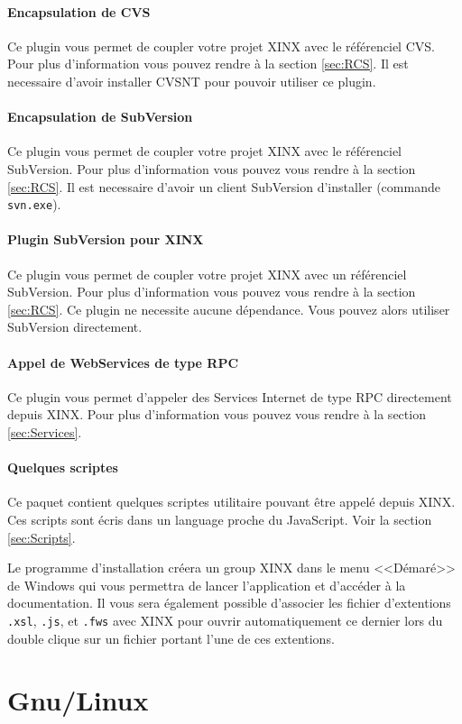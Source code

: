 \documentclass[a4paper,10pt,twoside]{book}
\begin{document}
\paragraph{Encapsulation de CVS} Ce plugin vous permet de coupler votre projet XINX avec le référenciel CVS. Pour plus d'information vous pouvez rendre à la section \ref{sec:RCS}. Il est necessaire d'avoir installer CVSNT pour pouvoir utiliser ce plugin.
\paragraph{Encapsulation de SubVersion} Ce plugin vous permet de coupler votre projet XINX avec le référenciel SubVersion. Pour plus d'information vous pouvez vous rendre à la section \ref{sec:RCS}. Il est necessaire d'avoir un client SubVersion d'installer (commande \verb+svn.exe+).
\paragraph{Plugin SubVersion pour XINX} Ce plugin vous permet de coupler votre projet XINX avec un référenciel SubVersion. Pour plus d'information vous pouvez vous rendre à la section \ref{sec:RCS}. Ce plugin ne necessite aucune dépendance. Vous pouvez alors utiliser SubVersion directement.
\paragraph{Appel de WebServices de type RPC} Ce plugin vous permet d'appeler des Services Internet de type RPC directement depuis XINX. Pour plus d'information vous pouvez vous rendre à la section \ref{sec:Services}.
\paragraph{Quelques scriptes} Ce paquet contient quelques scriptes utilitaire pouvant être appelé depuis XINX. Ces scripts sont écris dans un language proche du JavaScript. Voir la section \ref{sec:Scripts}.

Le programme d'installation créera un group XINX dans le menu <<Démaré>> de Windows qui vous permettra de lancer l'application et d'accéder à la documentation. Il vous sera également possible d'associer les fichier d'extentions \verb+.xsl+, \verb+.js+, et \verb+.fws+ avec XINX pour ouvrir automatiquement ce dernier lors du double clique sur un fichier portant l'une de ces extentions.

\section{Gnu/Linux}
\end{document}
